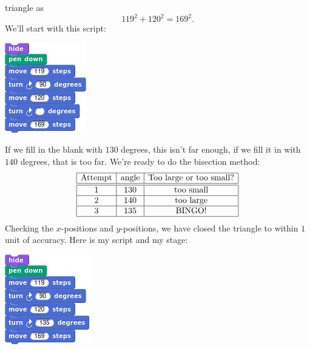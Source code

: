 \documentclass[noauthor,nooutcomes,handout,12pt]{ximera}
\begin{document}
\begin{question}
\begin{freeResponse}
\begin{description}
        triangle as
        \[
        119^2 + 120^2 =169^2.
        \]
        We'll start with this script:
        \begin{center}
          \includegraphics{basicScriptRightBlank.png}
        \end{center}
        If we fill in the blank with $130$ degrees, this isn't far
        enough, if we fill it in with $140$ degrees, that is too
        far. We're ready to do the bisection method:
        \[
        \begin{array}{|c|c|c|c|}\hline
          \text{Attempt} & \text{angle} & \text{Too large or too small?} \\ \hline\hline
          1 & 130 & \text{too small} \\ \hline
          2 & 140 & \text{too large}  \\ \hline
          3 & 135 & \text{BINGO!}  \\ \hline
        \end{array}
        \]
        Checking the $x$-positions and $y$-positions, we have closed
        the triangle to within $1$ unit of accuracy. Here is my script and my stage:
        \begin{center}
          \includegraphics[width=.3\textwidth]{119120169-script.png}   \qquad {}
        \end{center}






\end{description}
\end{freeResponse}
\end{question}
\end{document}
